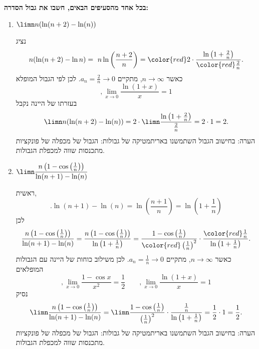 \textbf{בכל אחד מהסעיפים הבאים, חשבו את גבול הסדרה:}
\begin{enumerate}
\item
$\limn n(\ln(n+2)-\ln(n))$

\ifsol
{}
\begin{solbox}
נציג
\begin{align*}
    n(\ln(n+2)-\ln n)
    =\ n\ln\left(\frac{n+2}{n}\right)
    = {\color{red}2}\cdot
    \frac{\ln\left(1+\frac{2}{n}\right)}{\color{red}\frac{2}{n}}.
\end{align*}
כאשר
$n\to\infty$,
מתקיים
$a_n=\frac{2}{n}\to0$.
לכן לפי הגבול המופלא
$$,\lim_{x\to0}\frac{\ln(1+x)}{x}=1$$
בעזרתו של היינה
נקבל
\begin{align*}
    \limn n(\ln(n+2)-\ln(n))
    = 2\cdot
    \limn
    \frac{\ln\left(1+\frac{2}{n}\right)}{\frac{2}{n}}
    = 2\cdot1
    = 2.
\end{align*}
הערה: בחישוב הגבול השתמשנו באריתמטיקה של גבולות: הגבול של מכפלה של פונקציות מתכנסות שווה למכפלת הגבולות.
\end{solbox}
\fi

\item
$\displaystyle\limn \frac{n\left(1-\cos\left(\frac{1}{n}\right)\right)}{\ln(n+1)-\ln(n)}$

\ifsol
{}
\begin{solbox}
ראשית,
\[
    .\ln(n+1)-\ln(n)
    =
    \ln\left(\frac{n+1}{n}\right)
    =
    \ln\left(1+\frac{1}{n}\right)
\]
לכן
\begin{align*}
    \frac{n\left(1-\cos\left(\frac{1}{n}\right)\right)}{\ln(n+1)-\ln(n)}
    =
    \frac{n\left(1-\cos\left(\frac{1}{n}\right)\right)}
    {\ln\left(1+\frac{1}{n}\right)}
    =
    \frac{1-\cos\left(\frac{1}{n}\right)}
    {\color{red}\left(\frac{1}{n}\right)^2}
    \cdot
    \frac{\color{red}\frac{1}{n}}
    {\ln\left(1+\frac{1}{n}\right)}.
\end{align*}
כאשר
$n\to\infty$,
מתקיים
$a_n=\frac{1}{n}\to0$.
לכן משילוב כוחות של היינה עם הגבולות המופלאים
$$,\lim_{x\to0}\frac{1-\cos x}{x^2}=\frac12
\qquad
,\lim_{x\to0}\frac{\ln(1+x)}{x}=1$$
נסיק
\begin{align*}
    \limn
    \frac{n\left(1-\cos\left(\frac{1}{n}\right)\right)}
    {\ln(n+1)-\ln(n)}
    =
    \limn
    \frac{1-\cos\left(\frac{1}{n}\right)}
    {\left(\frac{1}{n}\right)^2}
    \cdot
    \frac{\frac{1}{n}}
    {\ln\left(1+\frac{1}{n}\right)}
    = \frac12\cdot1
    = \frac12.
\end{align*}
הערה: בחישוב הגבול השתמשנו באריתמטיקה של גבולות: הגבול של מכפלה של פונקציות מתכנסות שווה למכפלת הגבולות.
\end{solbox}
\fi
\eMs
\end{enumerate}
